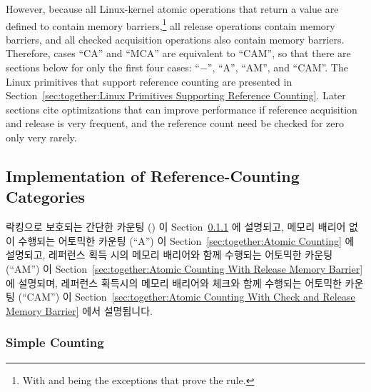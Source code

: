 However, because all Linux-kernel atomic operations that return a
value are defined to contain memory barriers,\footnote{
	With  and  being the
	exceptions that prove the rule.}
all release operations
contain memory barriers, and all checked acquisition operations also
contain memory barriers.
Therefore, cases ``CA'' and ``MCA'' are equivalent to ``CAM'', so that
there are sections below for only the first four cases:
``$-$'', ``A'', ``AM'', and ``CAM''.
The Linux primitives that support reference counting are presented in
Section~\ref{sec:together:Linux Primitives Supporting Reference Counting}.
Later sections cite optimizations that can improve performance
if reference acquisition and release is very frequent, and the
reference count need be checked for zero only very rarely.
\fi

\subsection{Implementation of Reference-Counting Categories}
\label{sec:together:Implementation of Reference-Counting Categories}

락킹으로 보호되는 간단한 카운팅 () 이
Section~\ref{sec:together:Simple Counting} 에 설명되고,
메모리 배리어 없이 수행되는 어토믹한 카운팅 (``A'') 이
Section~\ref{sec:together:Atomic Counting} 에 설명되고,
레퍼런스 획득 시의 메모리 배리어와 함께 수행되는 어토믹한 카운팅 (``AM'') 이
Section~\ref{sec:together:Atomic Counting With Release Memory Barrier}
에 설명되며, 레퍼런스 획득시의 메모리 배리어와 체크와 함께 수행되는 어토믹한
카운팅 (``CAM'') 이
Section~\ref{sec:together:Atomic Counting With Check and Release Memory Barrier}
에서 설명됩니다.
\iffalse

Simple counting protected by locking (``$-$'') is described in
Section~\ref{sec:together:Simple Counting},
atomic counting with no memory barriers (``A'') is described in
Section~\ref{sec:together:Atomic Counting},
atomic counting with acquisition memory barrier (``AM'') is described in
Section~\ref{sec:together:Atomic Counting With Release Memory Barrier},
and
atomic counting with check and release memory barrier (``CAM'') is described in
Section~\ref{sec:together:Atomic Counting With Check and Release Memory Barrier}.
\fi

\subsubsection{Simple Counting}
\label{sec:together:Simple Counting}

